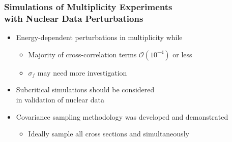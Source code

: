 \begin{frame}
\frametitle{Simulations of Multiplicity Experiments \\ with Nuclear Data Perturbations}
	\vspace{-0.2in}
\begin{itemize}
    \item[] Energy-dependent \nubar perturbations  in multiplicity while  \keff
      \begin{itemize}\vspace{0.1in}
		\item Majority of cross-correlation terms $\mathcal{O}(10^{-4})$ or less
            \vspace{-0.1in}
        \item $\sigma_f$ may need more investigation
	  \end{itemize}
      \item[] Subcritical simulations should be considered \\ in validation of nuclear data
      \item[] Covariance sampling methodology was developed and demonstrated
	\begin{itemize}
	 	\item Ideally sample all cross sections and \nubar simultaneously 

\end{itemize} 
\end{itemize}
\end{frame} 


\author{S.R. Bolding, \and C.J. Solomon}
\date{ANS National Meeting, 14 November 2013}%
\begin{frame}
\vspace{-0.2in}
\centering


\end{frame} 






















